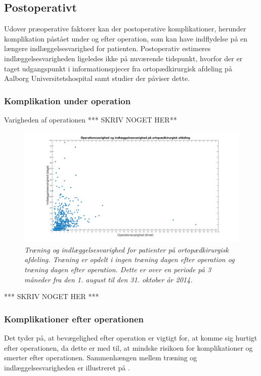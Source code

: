 \subsection{Postoperativt}
Udover præoperative faktorer kan der postoperative komplikationer, herunder komplikation påstået under og efter operation, som kan have indflydelse på en længere indlæggelsesvarighed for patienten. Postoperativ estimeres indlæggelsesvarigheden ligeledes ikke på nuværende tidspunkt, hvorfor der er taget udgangspunkt i informationspjecer fra ortopædkirurgisk afdeling på Aalborg Universitetshospital samt studier der påviser dette.

\subsubsection{Komplikation under operation}
Varigheden af operationen 
*** SKRIV NOGET HER** 

\begin{figure}[H]
	\centering
	\includegraphics[scale=0.35]{figures/opindlaeg.png}
	\caption{\textit{Træning og indlæggelsesvarighed for patienter på ortopædkirurgisk afdeling. Træning er opdelt i ingen træning dagen efter operation og træning dagen efter operation. Dette er over en periode på 3 måneder fra den 1. august til den 31. oktober år 2014.}}
	\label{opindlaeg}
	\end{figure}

\noindent
*** SKRIV NOGET HER ***


\subsubsection{Komplikationer efter operationen}
Det tyder på, at bevægelighed efter operation er vigtigt for, at komme sig hurtigt efter operationen, da dette er med til, at mindske risikoen for komplikationer og smerter efter operationen. Sammenhængen mellem træning og indlæggelsesvarigheden er illustreret på .

